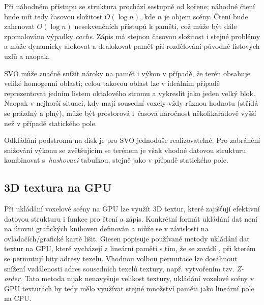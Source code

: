 Při náhodném přístupu se struktura prochází sestupně od kořene; náhodné čtení bude mít tedy časovou složitost $O(\log n)$, kde $n$ je objem scény. Čtení bude zahrnovat $O(\log n)$ nesekvenčních přístupů k paměti, což může být dále zpomalováno výpadky \textit{cache}. Zápis má stejnou časovou složitost i stejné problémy a může dynamicky alokovat a dealokovat paměť při rozdělování původně listových uzlů a naopak.

SVO může značně snížit nároky na paměť i výkon v případě, že terén obsahuje veliké homogenní oblasti; celou takovou oblast lze v ideálním případě reprezentovat jedním listem oktalového stromu a vykreslit jako jeden velký blok. Naopak v nejhorší situaci, kdy mají sousední voxely vždy různou hodnotu (střídá se prázdný a plný), může být prostorová i~časová náročnost několikařádově vyšší než v případě statického pole.

Odkládání podstromů na disk je pro SVO jednoduše realizovatelné. Pro zabránění snižování výkonu se zvětšujícím se terénem je však vhodné datovou strukturu kombinovat s~\textit{hashovací} tabulkou, stejně jako v případě statického pole.

\subsection{3D textura na GPU}

Při ukládání voxelové scény na GPU lze využít 3D textur, které zajišťují efektivní datovou strukturu i funkce pro čtení a zápis. Konkrétní formát ukládání dat není na úrovni grafických knihoven definován a může se v závislosti na ovladačích/grafické kartě lišit. Giesen \cite{Giesen1712011} popisuje používané metody ukládání dat textur na GPU, které vycházejí z lineární paměti s tím, že se zavádí , při kterém se permutují bity adresy texelu. Vhodnou volbou permutace lze dosáhnout snížení vzdálenosti adres sousedních texelů textury, např. vytvořením tzv. \textit{Z-order}. Tato metoda nijak nenavyšuje velikost textury, ukládání voxelové scény v GPU texturách by tedy mělo využívat stejné množství paměti jako lineární pole na CPU.

